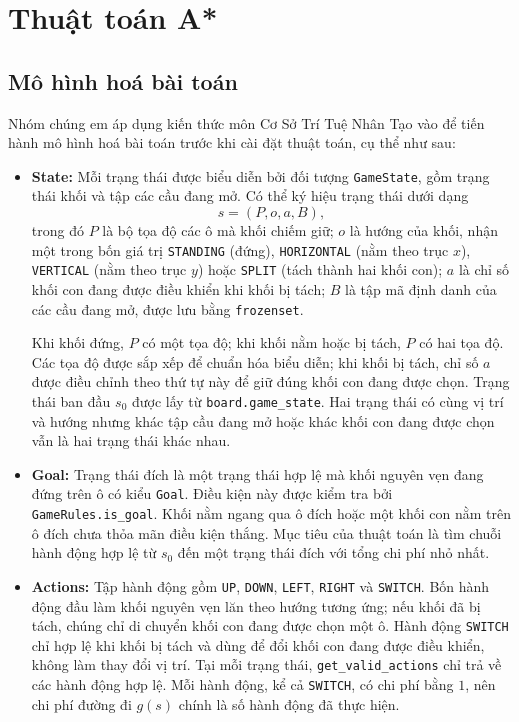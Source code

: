 \section{Thuật toán A*}
\subsection{Mô hình hoá bài toán}
Nhóm chúng em áp dụng kiến thức môn Cơ Sở Trí Tuệ Nhân Tạo vào để tiến hành mô hình hoá bài toán trước khi cài đặt thuật toán, cụ thể như sau:
\begin{itemize}
    \item \textbf{State:} Mỗi trạng thái được biểu diễn bởi đối tượng
    \texttt{GameState}, gồm trạng thái khối và tập các cầu đang mở. Có thể
    ký hiệu trạng thái dưới dạng
    \[
        s = (P, o, a, B),
    \]
    trong đó $P$ là bộ tọa độ các ô mà khối chiếm giữ; $o$ là hướng của
    khối, nhận một trong bốn giá trị \texttt{STANDING} (đứng),
    \texttt{HORIZONTAL} (nằm theo trục $x$), \texttt{VERTICAL} (nằm theo
    trục $y$) hoặc \texttt{SPLIT} (tách thành hai khối con); $a$ là chỉ số
    khối con đang được điều khiển khi khối bị tách; $B$ là tập mã định danh
    của các cầu đang mở, được lưu bằng \texttt{frozenset}.

    Khi khối đứng, $P$ có một tọa độ; khi khối nằm hoặc bị tách, $P$ có
    hai tọa độ. Các tọa độ được sắp xếp để chuẩn hóa biểu diễn; khi khối
    bị tách, chỉ số $a$ được điều chỉnh theo thứ tự này để giữ đúng khối
    con đang được chọn. Trạng thái ban đầu $s_0$ được lấy từ
    \texttt{board.game\_state}. Hai trạng thái có cùng vị trí và hướng
    nhưng khác tập cầu đang mở hoặc khác khối con đang được chọn vẫn là
    hai trạng thái khác nhau.

    \item \textbf{Goal:} Trạng thái đích là một trạng thái hợp lệ mà khối
    nguyên vẹn đang đứng trên ô có kiểu \texttt{Goal}. Điều kiện này được
    kiểm tra bởi \texttt{GameRules.is\_goal}. Khối nằm ngang qua ô đích
    hoặc một khối con nằm trên ô đích chưa thỏa mãn điều kiện thắng.
    Mục tiêu của thuật toán là tìm chuỗi hành động hợp lệ từ $s_0$ đến
    một trạng thái đích với tổng chi phí nhỏ nhất.

    \item \textbf{Actions:} Tập hành động gồm \texttt{UP}, \texttt{DOWN},
    \texttt{LEFT}, \texttt{RIGHT} và \texttt{SWITCH}. Bốn hành động đầu
    làm khối nguyên vẹn lăn theo hướng tương ứng; nếu khối đã bị tách,
    chúng chỉ di chuyển khối con đang được chọn một ô. Hành động
    \texttt{SWITCH} chỉ hợp lệ khi khối bị tách và dùng để đổi khối con
    đang được điều khiển, không làm thay đổi vị trí.
    Tại mỗi trạng thái, \texttt{get\_valid\_actions} chỉ trả về các hành
    động hợp lệ. Mỗi hành động, kể cả \texttt{SWITCH}, có chi phí bằng
    $1$, nên chi phí đường đi $g(s)$ chính là số hành động đã thực hiện.


\end{itemize}
